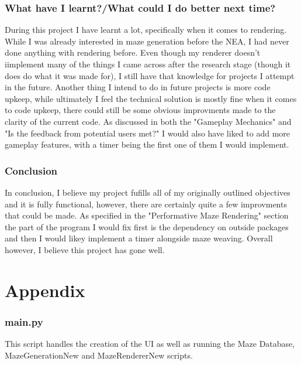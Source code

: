 \documentclass{article}
\begin{document}
\section{What have I learnt?/What could I do better next time?}
During this project I have learnt a lot, specifically when it comes to rendering. While I was already interested in maze generation before the NEA, I had never done anything with rendering before. Even though my renderer doesn't iimplement many of the things I came across after the research stage (though it does do what it was made for), I still have that knowledge for projects I attempt in the future. Another thing I intend to do in future projects is more code upkeep, while ultimately I feel the technical solution is mostly fine when it comes to code upkeep, there could still be some obvious improvments made to the clarity of the current code. As discussed in both the "Gameplay Mechanics" and "Is the feedback from potential users met?" I would also have liked to add more gameplay features, with a timer being the first one of them I would implement. 

\section{Conclusion}
In conclusion, I believe my project fufills all of my originally outlined objectives and it is fully functional, however, there are certainly quite a few improvments that could be made. As specified in the "Performative Maze Rendering" section the part of the program I would fix first is the dependency on outside packages and then I would likey implement a timer alongside maze weaving. Overall however, I believe this project has gone well.

\clearpage

\clearpage
\part{Appendix}
\section{main.py}
This script handles the creation of the UI as well as running the Maze Database, MazeGenerationNew and 
MazeRendererNew scripts.
\end{document}
